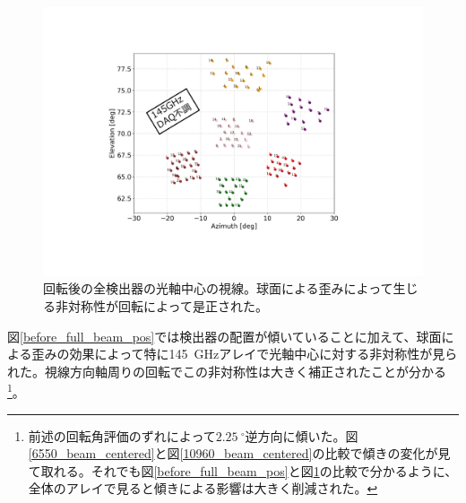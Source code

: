 \begin{figure}[htbp]
  \centering
  \includegraphics[width=0.96\columnwidth]{5_alignment/figs/after_full_pos_70_mod.pdf}
  \caption{回転後の全検出器の光軸中心の視線。球面による歪みによって生じる非対称性が回転によって是正された。}
  \label{after_full_pos_70}
\end{figure}
図\ref{before_full_beam_pos}では検出器の配置が傾いていることに加えて、球面による歪みの効果によって特に\SI{145}{GHz}アレイで光軸中心に対する非対称性が見られた。視線方向軸周りの回転でこの非対称性は大きく補正されたことが分かる\footnote{前述の回転角評価のずれによって$\SI{2.25}{^{\circ}}$逆方向に傾いた。図\ref{6550_beam_centered}と図\ref{10960_beam_centered}の比較で傾きの変化が見て取れる。それでも図\ref{before_full_beam_pos}と図\ref{after_full_pos_70}の比較で分かるように、全体のアレイで見ると傾きによる影響は大きく削減された。}。%
